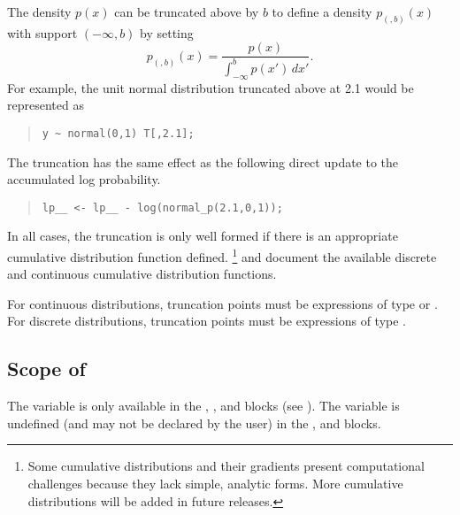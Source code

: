 The density $p(x)$ can be truncated above by $b$ to define a density
$p_{(,b)}(x)$ with support $(-\infty,b)$ by setting
\[
p_{(,b)}(x) = \frac{p(x)}
                    {\int_{-\infty}^b p(x') \, dx'}.
\]
For example, the unit normal distribution truncated above at 2.1 would
be represented as
%
\begin{quote}
\begin{Verbatim} 
y ~ normal(0,1) T[,2.1];
\end{Verbatim}
\end{quote}
% 
The truncation has the same effect as the following direct update to
the accumulated log probability.
%
\begin{quote}
\begin{Verbatim}
lp__ <- lp__ - log(normal_p(2.1,0,1));
\end{Verbatim}
\end{quote}

In all cases, the truncation is only well formed if there is an
appropriate cumulative distribution function defined.%
%
\footnote{Some cumulative distributions and their gradients present
  computational challenges because they lack simple, analytic forms.
  More cumulative distributions will be added in future releases.}
%
 and
 document the available discrete
and continuous cumulative distribution functions.

For continuous distributions, truncation points must be expressions of
type  or .  For discrete distributions, truncation
points must be expressions of type .


\subsection{Scope of\, }

The variable  is only available in the ,
, and  blocks (see
).  The variable  is undefined (and
may not be declared by the user) in the ,  and  blocks.



